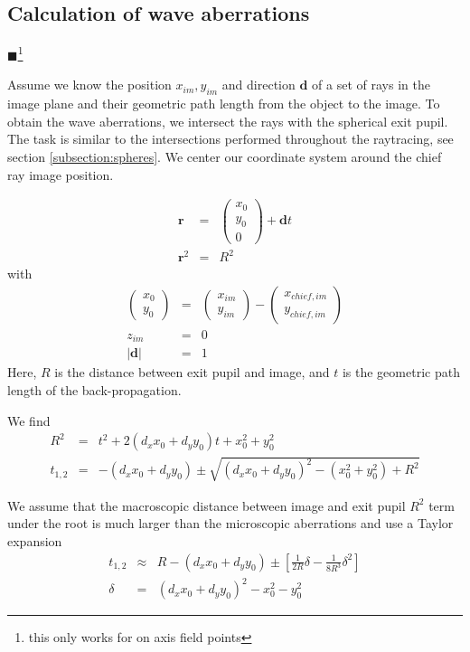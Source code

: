 \documentclass[12pt,a4paper,twoside,openright,BCOR10mm,headsepline,titlepage,abstracton,chapterprefix,final]{scrreprt}
\newcommand\Vector[1]{{\mathbf{#1}}}
\newcommand\Location{\Vector{r}}
\newcommand{\remark}[1]{{\color{red}$\blacksquare$}\footnote{{\color{red}#1}}}
\begin{document}
\subsection{Calculation of wave aberrations}
\remark{this only works for on axis field points}

Assume we know the position $x_{im}, y_{im}$ and direction $\Vector{d}$ of a set of rays in the image plane and their geometric path length from the object to the image.
To obtain the wave aberrations, we intersect the rays with the spherical exit pupil.
The task is similar to the intersections performed throughout the raytracing, see section \ref{subsection:spheres}.
We center our coordinate system around the chief ray image position.

\begin{eqnarray}
 \Location &=& \begin{pmatrix} x_0 \\ y_0 \\ 0 \end{pmatrix} + \Vector{d} t \\
 \Location^2 &=& R^2
\end{eqnarray}
with
 \begin{eqnarray}
 \begin{pmatrix} x_0 \\ y_0 \end{pmatrix} &=& \begin{pmatrix} x_{im} \\ y_{im} \end{pmatrix} - \begin{pmatrix} x_{chief,im} \\ y_{chief,im} \end{pmatrix} \\
 z_{im} &=& 0 \\
 | \Vector{d} | &=& 1
\end{eqnarray}
Here, $R$ is the distance between exit pupil and image, and $t$ is the geometric path length of the back-propagation.

We find
\begin{eqnarray}
 R^2 &=&  t^2 + 2 (d_x x_0 + d_y y_0) t + x_0^2 + y_0^2 \\
 t_{1,2} &=& - (d_x x_0 + d_y y_0) \pm \sqrt{ (d_x x_0 + d_y y_0)^2 - (x_0^2 + y_0^2) + R^2 }
\end{eqnarray}

We assume that the macroscopic distance between image and exit pupil $R^2$ term under the root is much larger than the microscopic aberrations and use a Taylor expansion
\begin{eqnarray}
 t_{1,2} &\approx& R - (d_x x_0 + d_y y_0) \pm 
 \left[ 
   \frac{1}{2R} \delta - \frac{1}{8R^3} \delta^2
 \right]
 \\
 \delta &=& (d_x x_0 + d_y y_0)^2 - x_0^2 - y_0^2
\end{eqnarray}
\end{document}
